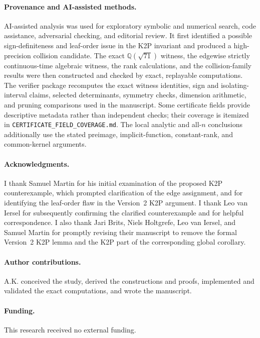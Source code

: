 \documentclass[11pt]{article}
\theoremstyle{remark}\newtheorem{remark}[theorem]{Remark}
\begin{document}
\paragraph{Provenance and AI-assisted methods.}
AI-assisted analysis was used for exploratory symbolic and numerical search, code assistance, adversarial checking, and editorial review. It first identified a possible sign-definiteness and leaf-order issue in the K2P invariant and produced a high-precision collision candidate. The exact $\mathbb Q(\sqrt{71})$ witness, the edgewise strictly continuous-time algebraic witness, the rank calculations, and the collision-family results were then constructed and checked by exact, replayable computations. The verifier package recomputes the exact witness identities, sign and isolating-interval claims, selected determinants, symmetry checks, dimension arithmetic, and pruning comparisons used in the manuscript. Some certificate fields provide descriptive metadata rather than independent checks; their coverage is itemized in \texttt{CERTIFICATE\_FIELD\_COVERAGE.md}. The local analytic and all-$n$ conclusions additionally use the stated preimage, implicit-function, constant-rank, and common-kernel arguments.

\paragraph{Acknowledgments.}
I thank Samuel Martin for his initial examination of the proposed K2P counterexample, which prompted clarification of the edge assignment, and for identifying the leaf-order flaw in the Version~2 K2P argument. I thank Leo van Iersel for subsequently confirming the clarified counterexample and for helpful correspondence. I also thank Jari Brits, Niels Holtgrefe, Leo van Iersel, and Samuel Martin for promptly revising their manuscript to remove the formal Version~2 K2P lemma and the K2P part of the corresponding global corollary.

\paragraph{Author contributions.}
A.K. conceived the study, derived the constructions and proofs, implemented and validated the exact computations, and wrote the manuscript.

\paragraph{Funding.}
This research received no external funding.
\end{document}
